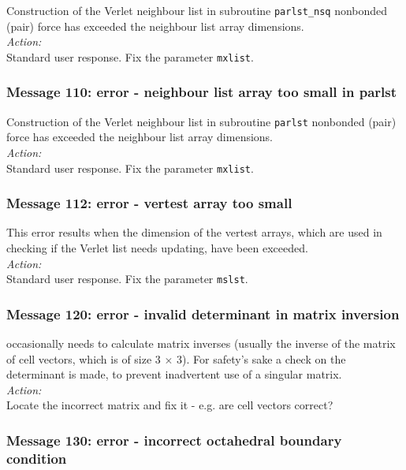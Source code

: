 Construction of the Verlet neighbour list 
in subroutine {\tt parlst\_nsq} nonbonded (pair) force has exceeded the
neighbour list array dimensions. \\

\noindent
{\em Action:} \\ 
Standard user response. Fix the parameter {\tt mxlist}.

\subsubsection*{Message 110: error - neighbour list array too small in
          parlst}

Construction of the Verlet neighbour list 
in subroutine {\tt parlst} nonbonded (pair) force has exceeded the
neighbour list array dimensions. \\

\noindent
{\em Action:} \\ 
Standard user response. Fix the parameter {\tt mxlist}.

\subsubsection*{Message 112: error - vertest array too small}

This error results when the dimension of the \D{} {\sc
vertest} arrays, which are used in checking if the Verlet list needs
updating, have been exceeded.\\

\noindent
{\em Action:} \\ 
Standard user response. Fix the parameter {\tt mslst}.

\subsubsection*{Message 120: error - invalid determinant in matrix inversion}

\D{} occasionally needs to calculate matrix inverses (usually the
inverse of the matrix of cell vectors, which is of size 3 $\times$ 3).
For safety's sake a check on the determinant is made, to prevent
inadvertent use of a singular matrix. \\ 

\noindent
{\em Action:} \\ Locate the incorrect matrix and fix it - e.g. are
cell vectors correct?

\subsubsection*{Message 130: error - incorrect octahedral boundary condition}

